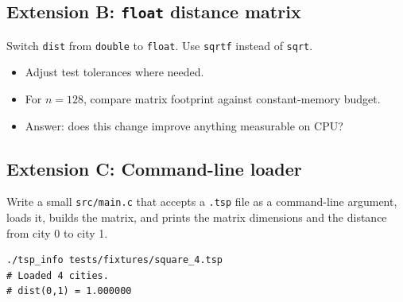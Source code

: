 \subsection*{Extension B: \texttt{float} distance matrix}
Switch \texttt{dist} from \texttt{double} to \texttt{float}. Use \texttt{sqrtf} instead of \texttt{sqrt}.
\begin{itemize}
  \item Adjust test tolerances where needed.
  \item For $n = 128$, compare matrix footprint against constant-memory budget.
  \item Answer: does this change improve anything measurable on CPU?
\end{itemize}

\subsection*{Extension C: Command-line loader}
Write a small \texttt{src/main.c} that accepts a \texttt{.tsp} file as a command-line argument, loads it, builds the matrix, and prints the matrix dimensions and the distance from city 0 to city 1.

\begin{lstlisting}[style=shellstyle]
./tsp_info tests/fixtures/square_4.tsp
# Loaded 4 cities.
# dist(0,1) = 1.000000
\end{lstlisting}
